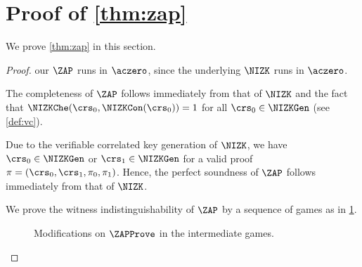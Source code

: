\section{Proof of \cref{thm:zap}}
\label{sec:proof-zap}
We prove \cref{thm:zap} in this section.
\begin{proof}
 our $\ZAP$ runs in $\aczero$, since the underlying $\NIZK$ runs in $\aczero$.

The completeness of $\ZAP$ follows immediately from that of $\NIZK$ and the fact that $\NIZKChe(\crs_0,\NIZKCon(\crs_0))=1$ for all $\crs_0\in\NIZKGen$ (see \cref{def:vc}). 

Due to the verifiable correlated key generation of $\NIZK$, we have $\crs_0\in\NIZKGen$ or $\crs_1\in\NIZKGen$ for a valid proof $\pi=(\crs_0,\crs_1,\pi_0,\pi_1)$. Hence, the perfect soundness of $\ZAP$ follows immediately from that of $\NIZK$.

We prove the witness indistinguishability of $\ZAP$ by  a sequence of  games as in \cref{fig:games-zap}.

\begin{figure}[htbp]
\begin{center}
\end{center}
\caption{Modifications on $\ZAPProve$ in the intermediate games.}
\label{fig:games-zap}
\end{figure}


\end{proof}
